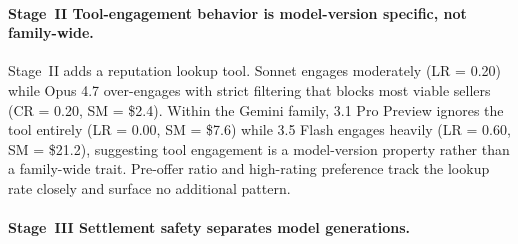 \documentclass{article} %
\begin{document}
\paragraph{Stage~II Tool-engagement behavior is model-version specific, not family-wide.}
Stage~II adds a reputation lookup tool. Sonnet engages moderately (LR = 0.20) while Opus 4.7 over-engages with strict filtering that blocks most viable sellers (CR = 0.20, SM = \$2.4). Within the Gemini family, 3.1 Pro Preview ignores the tool entirely (LR = 0.00, SM = \$7.6) while 3.5 Flash engages heavily (LR = 0.60, SM = \$21.2), suggesting tool engagement is a model-version property rather than a family-wide trait. Pre-offer ratio and high-rating preference track the lookup rate closely and surface no additional pattern.

\paragraph{Stage~III Settlement safety separates model generations.}
\end{document}
